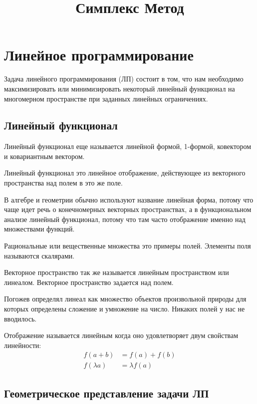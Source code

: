 \documentclass[a4paper,article,14pt]{extarticle}
\title{Симплекс Метод}
\begin{document}
\maketitle
\newpage
\tableofcontents
\newpage

\section{Линейное программирование}

Задача линейного программирования (ЛП) состоит в том, что нам необходимо максимизировать или минимизировать некоторый линейный функционал на многомерном пространстве при заданных линейных ограничениях.

\subsection{Линейный функционал}

Линейный функционал еще называется линейной формой, 1-формой, ковектором и ковариантным вектором.

Линейный функционал это линейное отображение, действующее из векторного пространства над полем в это же поле.

В алгебре и геометрии обычно используют название линейная форма, потому что чаще идет речь о конечномерных векторных пространствах, а в функциональном анализе линейный функционал, потому что там часто отображение именно над множествами функций.

Рациональные или вещественные множества это примеры полей.
Элементы поля называются скалярами.

Векторное пространство так же называется линейным пространством или линеалом.
Векторное пространство задается над полем.

Погожев определял линеал как множество объектов произвольной природы для которых определены сложение и умножение на число.
Никаких полей у нас не вводилось.

Отображение называется линейным когда оно удовлетворяет двум свойствам линейности:
\begin{equation}
    \begin{aligned}
        f(a + b) & = f(a) + f(b) \\
        f(\lambda a) & = \lambda f(a)
    \end{aligned}
\end{equation}

\subsection{Геометрическое представление задачи ЛП}
\end{document}
